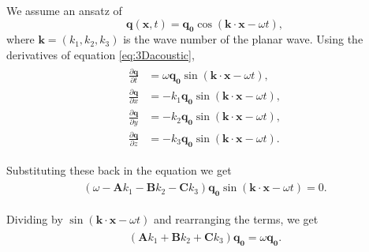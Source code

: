 We assume an ansatz of 
\begin{equation}
    \mathbf{q}\left(\mathbf{x}, t\right) = \mathbf{q_0} \cos\left(\mathbf{k}\cdot\mathbf{x} - \omega t\right),
\end{equation}
where $\mathbf{k}=\left(k_1, k_2, k_3\right)$ is the wave number of the planar wave. Using the derivatives of equation \ref{eq:3Dacoustic},
\begin{align}
    \begin{split}
    \frac{\partial \mathbf{q}}{\partial t} &= \omega \mathbf{q_0} \sin\left(\mathbf{k}\cdot\mathbf{x} - \omega t\right), \\
    \frac{\partial \mathbf{q}}{\partial x} &= -k_1 \mathbf{q_0} \sin\left(\mathbf{k}\cdot\mathbf{x} - \omega t\right), \\
    \frac{\partial \mathbf{q}}{\partial y} &= -k_2 \mathbf{q_0} \sin\left(\mathbf{k}\cdot\mathbf{x} - \omega t\right), \\
    \frac{\partial \mathbf{q}}{\partial z} &= -k_3 \mathbf{q_0} \sin\left(\mathbf{k}\cdot\mathbf{x} - \omega t\right).
\end{split}
\end{align}

Substituting these back in the equation we get
\begin{align}
    \begin{split}
        \left(\omega - \mathbf{A}k_1 - \mathbf{B}k_2 - \mathbf{C}k_3\right)\mathbf{q_0}\sin\left(\mathbf{k}\cdot\mathbf{x} - \omega t\right) = 0.
    \end{split}
\end{align}

Dividing by $\sin\left(\mathbf{k}\cdot\mathbf{x} - \omega t\right)$ and rearranging the terms, we get
\begin{align}
    \begin{split}
        \left(\mathbf{A}k_1 + \mathbf{B}k_2 + \mathbf{C}k_3\right)\mathbf{q_0} = \omega \mathbf{q_0} .
    \end{split}
\end{align}

